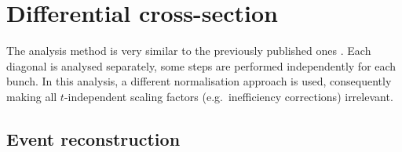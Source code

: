 \section{Differential cross-section}

The analysis method is very similar to the previously published ones \cite{prl111,epl101-el}. Each diagonal is analysed
separately, some steps are performed independently for each bunch. In this analysis, a different normalisation
approach is used, consequently making all $t$-independent scaling factors (e.g.~inefficiency corrections)
irrelevant.

\subsection{Event reconstruction}


